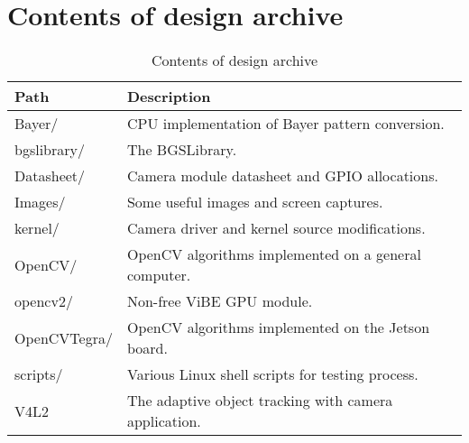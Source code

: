 \chapter{Contents of design archive} \label{Appendix:Archive}

\begin{table}[!htb]
  \centering
  \begin{tabular}{|l|l|}
  \hline
  \textbf{Path} & \textbf{Description} \\ \hline
  Bayer/ & CPU implementation of Bayer pattern conversion. \\ \hline
  bgslibrary/ & The BGSLibrary. \\ \hline
  Datasheet/ & Camera module datasheet and GPIO allocations. \\ \hline
  Images/ & Some useful images and screen captures.\\ \hline
  kernel/ & Camera driver and kernel source modifications. \\ \hline
  OpenCV/ & OpenCV algorithms implemented on a general computer. \\ \hline
  opencv2/ & Non-free ViBE GPU module. \\ \hline
  OpenCVTegra/ & OpenCV algorithms implemented on the Jetson board. \\ \hline
  scripts/ & Various Linux shell scripts for testing process. \\ \hline
  V4L2 & The adaptive object tracking with camera application. \\ \hline
  \end{tabular}
  \caption{Contents of design archive}
\end{table}

\clearpage
